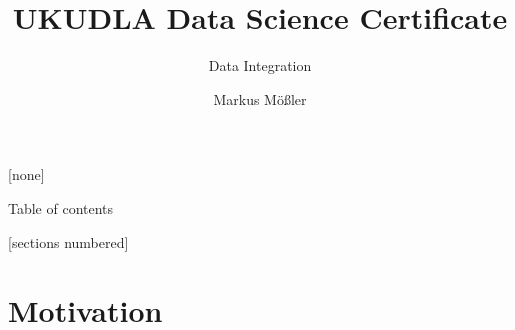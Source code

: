 \documentclass[10pt,aspectratio=169]{beamer}
\title{UKUDLA Data Science Certificate}
\subtitle{Data Integration}
\author{Markus Mößler}
\institute{University of Hohenheim}
\begin{document}
\maketitle

{
[none]

\begin{frame}[noframenumbering]{Table of contents}

  \small
  [sections numbered]
  \tableofcontents[hideallsubsections]

\end{frame}
}



\section{Motivation}
\end{document}
